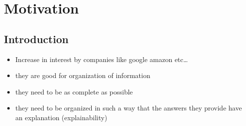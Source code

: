 \chapter{Motivation}\label{chap:motivation}



\section{Introduction}\label{sec:moti-intro}
\begin{itemize}
    \item Increase in interest by companies like google amazon etc\dots
    \item they are good for organization of information
    \item they need to be as complete as possible
    \item they need to be organized in such a way that the answers they provide have an explanation (explainability)
\end{itemize}

